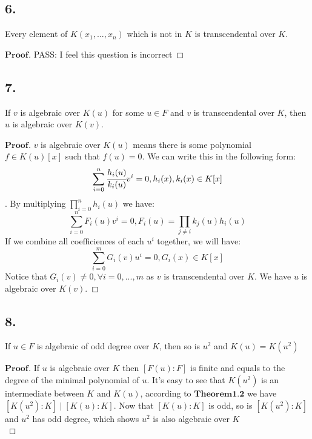 \documentclass[a4paper, 11pt]{article}
\newenvironment{myprf}
{\renewcommand\qedsymbol{$ $}\begin{proof}[$\textbf{Proof}$]}
  {\end{proof}}
\begin{document}
\subsection*{6.}
Every element of $K(x_1,...,x_n)$ which is not in $K$ is transcendental over $K$.
\begin{myprf}
       PASS: I feel this question is incorrect
\end{myprf}
\subsection*{7.}
If $v$ is algebraic over $K(u)$ for some $u\in F$ and $v$ is transcendental over $K$,
then $u$ is algebraic over $K(v)$.
\begin{myprf}
    $v$ is algebraic over $K(u)$ means there is some polynomial $f\in K(u)[x]$ such that
    $f(u)=0$. We can write this in the following form:
    $$
    \sum_{i=0}^{n}\cfrac{h_i(u)}{k_i(u)} v^{i} = 0, h_i(x),k_i(x)\in K[x]
    $$. By multiplying $\displaystyle \prod_{i=0}^n h_i(u)$ we have:
    $$
    \sum_{i=0}^{n}F_i(u)v^{i}=0, F_i(u)=\prod_{j\neq i}k_j(u)h_i(u)
    $$ If we combine all coefficiences of each $u^i$ together, we will have:
    $$
    \sum_{i=0}^{m}G_i(v)u^i=0, G_i(x)\in K[x]
    $$ Notice that $G_i(v)\neq 0,\forall i=0,...,m$ as $v$ is transcendental over $K$. 
    We have $u$ is algebraic over $K(v)$.
\end{myprf}

\subsection*{8.}
If $u\in F$ is algebraic of odd degree over $K$, then so is $u^2$ and $K(u)=K(u^2)$
\begin{myprf}
        If $u$ is algebraic over $K$ then $[F(u):F]$ is finite and equals to the degree
        of the minimal polynomial of $u$. It's easy to see that $K(u^2)$ is an 
        intermediate between $K$ and $K(u)$, according to $\textbf{Theorem1.2}$ we have
        $[K(u^2):K] \mid [K(u):K]$. Now that $[K(u):K]$ is odd, so is $[K(u^2):K]$ and 
        $u^2$ has odd degree, which shows $u^2$ is also algebraic over $K$\\
        \noindent 
       
\end{myprf}
\end{document}
